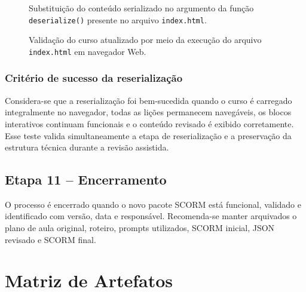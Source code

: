 \documentclass[12pt,a4paper]{article}
\begin{document}
\begin{figure}[H]
    \centering
    \fbox{\rule{0pt}{7cm}\rule{0.95\textwidth}{0pt}}
    \caption{Substituição do conteúdo serializado no argumento da função \texttt{deserialize()} presente no arquivo \texttt{index.html}.}
    \label{fig:reserializacao03}
\end{figure}

\begin{figure}[H]
    \centering
    \fbox{\rule{0pt}{7cm}\rule{0.95\textwidth}{0pt}}
    \caption{Validação do curso atualizado por meio da execução do arquivo \texttt{index.html} em navegador Web.}
    \label{fig:reserializacao04}
\end{figure}

\subsubsection*{Critério de sucesso da reserialização}

Considera-se que a reserialização foi bem-sucedida quando o curso é carregado integralmente no navegador, todas as lições permanecem navegáveis, os blocos interativos continuam funcionais e o conteúdo revisado é exibido corretamente. Esse teste valida simultaneamente a etapa de reserialização e a preservação da estrutura técnica durante a revisão assistida.

\subsection{Etapa 11 -- Encerramento}

O processo é encerrado quando o novo pacote SCORM está funcional, validado e identificado com versão, data e responsável. Recomenda-se manter arquivados o plano de aula original, roteiro, prompts utilizados, SCORM inicial, JSON revisado e SCORM final.

\section{Matriz de Artefatos}
\end{document}
